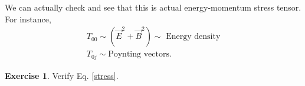 \documentclass[a4paper,11pt]{article}
\numberwithin{equation}{section}
\theoremstyle{definition}
\newtheorem{exmp}{Exercise}[section]
\begin{document}
We can actually check and see that this is actual energy-momentum stress tensor. For instance, 
\begin{align}
T_{00} \sim (\vec{E}^2 + \vec{B}^2) \sim \text{ Energy density}\\
T_{0j} \sim \text{Poynting vectors}.
\end{align}




















\begin{exmp}
	Verify Eq. \eqref{stress}.\\
	

\end{exmp}
\end{document}
